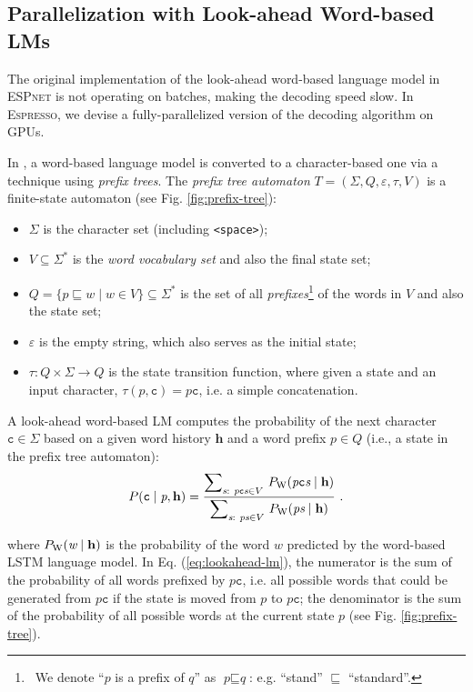 \documentclass{article}
\def\espresso{\textsc{Espresso}\xspace}
\def\espnet{\textsc{ESPnet}\xspace}
\def\prefix{\textit{p}}
\def\prefixq{\textit{q}}
\def\suffix{\textit{s}}
\def\word{{\textit{w}}}
\def\ch{\mathtt{c}}
\def\history{\mathbf{h}}
\begin{document}
\subsection{Parallelization with Look-ahead Word-based LMs}
\label{sec:lookahead_lm}
The original implementation of the look-ahead word-based language model in \espnet \cite{watanabe2018espnet} is not operating on batches, making the decoding speed slow. In \espresso, we devise a fully-parallelized version of the decoding algorithm on GPUs.

In \cite{hori2018endtoend}, a word-based language model is converted to a character-based one via a technique using \emph{prefix trees}. The \emph{prefix tree automaton} $T = (\Sigma, Q, \varepsilon, \tau, V)$ is a finite-state automaton (see Fig. \ref{fig:prefix-tree}):
\begin{itemize}
    \item $\Sigma$ is the character set (including \texttt{<space>});
    \item $V \subseteq \Sigma^*$ is the \emph{word vocabulary set} and also the final state set; 
    \item $Q = \{\prefix \sqsubseteq \word \mid \word \in V \} \subseteq \Sigma^*$ is the set of all \emph{prefixes}\footnote{~We 
denote ``$\prefix$ is a prefix of $\prefixq$'' as $\prefix \sqsubseteq \prefixq$: e.g. ``stand'' $\sqsubseteq$ ``standard''. } of the words in $V$ and also the state set; 
    \item $\varepsilon$ is the empty string, which also serves as the initial state;
    \item $\tau: Q \times \Sigma \to Q$ is the state transition function, where given a state and an input character, $\tau(\prefix, \ch) = \prefix \ch$, i.e. a simple concatenation. 
\end{itemize}

A look-ahead word-based LM computes the probability of the next character $\ch \in \Sigma$ based on a given word history $\history$ and a word prefix $\prefix \in Q$ (i.e., a state in the prefix tree automaton): 
\begin{equation}
\label{eq:lookahead-lm}
    P(\ch \mid \prefix, \history) = \dfrac{{\displaystyle\sum}_{\suffix: ~ \prefix \ch \suffix \in V} ~ P_{\rm W}(\prefix \ch \suffix \mid \history) } { {\displaystyle\sum}_{\suffix: ~\prefix\suffix \in V} ~ {P_{\rm W}(\prefix\suffix \mid \history )}} \ .
\end{equation}

\noindent where $P_{\rm W}(\word \mid \history)$ is the probability of the word $\word$ predicted by the word-based LSTM language model. In Eq. (\ref{eq:lookahead-lm}), the numerator is the sum of the probability of all words prefixed by $p\ch$, i.e. all possible words that could be generated from $p\ch$ if the state is moved from $p$ to $p\ch$; the denominator is the sum of the probability of all possible words at the current state $p$ (see Fig. \ref{fig:prefix-tree}).
\end{document}
